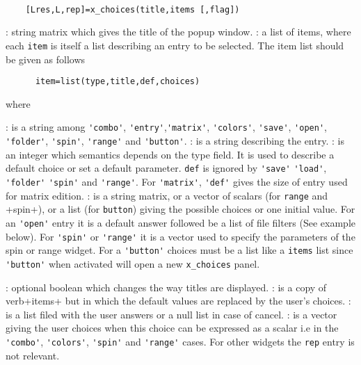 \begin{mandesc}
  \\ %
\end{mandesc}
\begin{calling_sequence}
  \begin{verbatim}
    [Lres,L,rep]=x_choices(title,items [,flag])   
  \end{verbatim}
\end{calling_sequence}
\begin{parameters}
  \begin{varlist}
    : string matrix which gives the title of the popup window.
    : a list of items, where each \verb!item! is itself a list 
    describing an entry to be selected. The item list should be given as follows 
    \begin{verbatim}
      item=list(type,title,def,choices) 
    \end{verbatim} 
    where 
    \begin{varlist}
      : is a string among \verb+'combo'+, \verb+'entry'+,\verb+'matrix'+, 
      \verb+'colors'+, \verb+'save'+, \verb+'open'+, \verb+'folder'+,  \verb+'spin'+, \verb+'range'+ and 
      \verb+'button'+.
    : is a string describing the entry. 
    : is an integer which semantics depends on the type field. It is used to describe a default choice or set 
      a default parameter. \verb+def+ is ignored by \verb+'save'+ 
      \verb+'load'+, \verb+'folder'+ \verb+'spin'+ and \verb+'range'+. 
      For \verb+'matrix'+, \verb+'def'+ gives the size of entry used for matrix edition.
    : is a string matrix, or a vector of scalars (for \verb+range+ and +spin+),
    or a list (for \verb+button+) giving the possible choices or one initial value. For an 
      \verb+'open'+ entry it is a default answer followed be a list of file filters (See example below). For 
      \verb+'spin'+ or \verb+'range'+ it is a vector used to specify the parameters of the spin or range widget.
      For a \verb+'button'+ choices must be a list like a \verb+items+ list since \verb+'button'+ when activated 
      will open a new \verb+x_choices+ panel.
    \end{varlist}
    : optional boolean which changes the way titles are displayed. 
    : is a copy of verb+items+ but in which the default values are replaced by the user's choices. 
    : is a list filed with the user answers or a null list in case of cancel.
    : is a vector giving the user choices when this choice can be expressed as a scalar 
    i.e in the \verb+'combo'+, \verb+'colors'+, \verb+'spin'+ and \verb+'range'+ cases. For other widgets 
    the \verb+rep+ entry is not relevant.
  \end{varlist}
\end{parameters}
